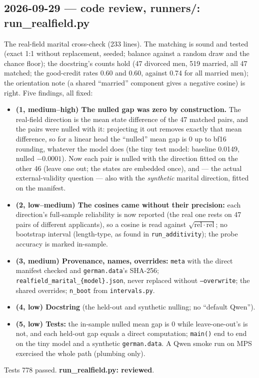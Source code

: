 \documentclass{article}
\begin{document}
\subsection*{2026-09-29 --- code review, runners/: run\_realfield.py}
The real-field marital cross-check (233 lines). The matching is sound and tested (exact 1:1 without replacement,
seeded; balance against a random draw and the chance floor); the docstring's counts hold (47 divorced men, 519 married,
all 47 matched; the good-credit rates 0.60 and 0.60, against 0.74 for all married men); the orientation note (a shared
``married'' component gives a negative cosine) is right. Five findings, all fixed:
\begin{itemize}
  \item \textbf{(1, medium--high) The nulled gap was zero by construction.} The real-field direction is the mean state
        difference of the 47 matched pairs, and the pairs were nulled with it: projecting it out removes exactly that
        mean difference, so for a linear head the ``nulled'' mean gap is 0 up to bf16 rounding, whatever the model does
        (the tiny test model: baseline 0.0149, nulled $-0.0001$). Now each pair is nulled with the direction fitted on
        the other 46 (leave one out; the states are embedded once), and --- the actual external-validity question ---
        also with the \emph{synthetic} marital direction, fitted on the manifest.
  \item \textbf{(2, low--medium) The cosines came without their precision:} each direction's full-sample reliability
        is now reported (the real one rests on 47 pairs of different applicants), so a cosine is read against
        $\sqrt{\mathrm{rel}\cdot\mathrm{rel}}$; no bootstrap interval (length-type, as found in \texttt{run\_additivity});
        the probe accuracy is marked in-sample.
  \item \textbf{(3, medium) Provenance, names, overrides:} \texttt{meta} with the direct manifest checked and
        \texttt{german.data}'s SHA-256; \texttt{realfield\_marital\_\{model\}.json}, never replaced without
        \texttt{--overwrite}; the shared overrides; \texttt{n\_boot} from \texttt{intervals.py}.
  \item \textbf{(4, low) Docstring} (the held-out and synthetic nulling; no ``default Qwen'').
  \item \textbf{(5, low) Tests:} the in-sample nulled mean gap is 0 while leave-one-out's is not, and each held-out gap
        equals a direct computation; \texttt{main()} end to end on the tiny model and a synthetic \texttt{german.data}.
        A Qwen smoke run on MPS exercised the whole path (plumbing only).
\end{itemize}
Tests 778 passed. \textbf{run\_realfield.py: reviewed}.
\end{document}
